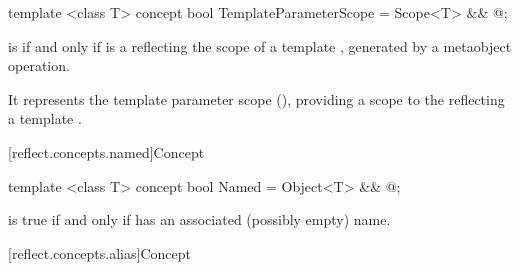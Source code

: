 \begin{std.txt}\color{addclr}

\begin{itemdecl}
template <class T> concept bool TemplateParameterScope = Scope<T> && @\seebelow@;
\end{itemdecl}

\begin{itemdescr}
\pnum
{} is  if and only if  is a  reflecting the scope of a template , generated by a metaobject operation. \begin{note} It represents the template parameter scope (), providing a scope to the  reflecting a template .\end{note}

\end{itemdescr}
\end{std.txt}

[reflect.concepts.named]{Concept }

\begin{std.txt}\color{addclr}

\begin{itemdecl}
template <class T> concept bool Named = Object<T> && @\seebelow@;
\end{itemdecl}

\begin{itemdescr}
\pnum
{} is true if and only if  has an associated (possibly empty) name.

\end{itemdescr}
\end{std.txt}

[reflect.concepts.alias]{Concept }


